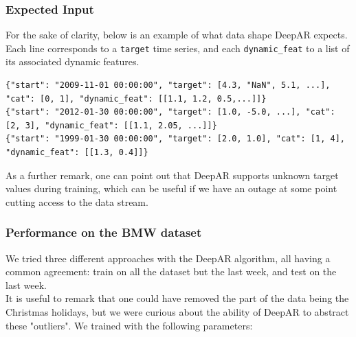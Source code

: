 \subsubsection{Expected Input}
For the sake of clarity, below is an example of what data shape DeepAR expects. Each line corresponds to a \lstinline{target} time series,  and each \lstinline{dynamic_feat} to a list of its associated dynamic features.


\begin{lstlisting}
{"start": "2009-11-01 00:00:00", "target": [4.3, "NaN", 5.1, ...], "cat": [0, 1], "dynamic_feat": [[1.1, 1.2, 0.5,...]]}
{"start": "2012-01-30 00:00:00", "target": [1.0, -5.0, ...], "cat": [2, 3], "dynamic_feat": [[1.1, 2.05, ...]]}
{"start": "1999-01-30 00:00:00", "target": [2.0, 1.0], "cat": [1, 4], "dynamic_feat": [[1.3, 0.4]]}
\end{lstlisting}

As a further remark, one can point out that DeepAR supports unknown target values during training, which can be useful if we have an outage at some point cutting access to the data stream.

\subsubsection{Performance on the BMW dataset}

We tried three different approaches with the DeepAR algorithm, all having a common agreement: train on all the dataset but the last week, and test on the last week. \\
It is useful to remark that one could have removed the part of the data being the Christmas holidays, but we were curious about the ability of DeepAR to abstract these "outliers". We trained with the following parameters:

